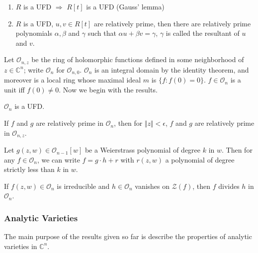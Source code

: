 \begin{enumerate}
	\item $R$ is a UFD $\Rightarrow$ $R[t]$ is a UFD (Gauss' lemma)
	\item $R$ is a UFD, $u,v \in R[t]$ are relatively prime, then there are relatively prime polynomials $\alpha, \beta$ and $\gamma$ such that $\alpha u + \beta v = \gamma$, $\gamma$ is called the resultant of $u$ and $v$.
\end{enumerate}

Let $ \mathcal{O}_{n,z}$ be the ring of holomorphic functions defined in some neighborhood of $z \in \mathbb{C}^n$; write $\mathcal{O}_n$ for $\mathcal{O}_{n,0}$. $ \mathcal{ O }_n$ is an integral domain by the identity theorem, and moreover is a local ring whose maximal ideal $m$ is $ \{ f: f(0)=0 \} $. $f \in \mathcal{ O }_n$ is a unit iff $f(0) \neq 0$. Now we begin with the results.


\begin{prop}

$ \mathcal{ O }_n$ is a UFD.

\end{prop}


\begin{prop}

	If $f$ and $g$ are relatively prime in $ \mathcal{ O }_n$, then for $ \Vert z \Vert < \epsilon$, $f$ and $g$ are relatively prime in $ \mathcal{ O }_{n,z}$.

\end{prop}


\begin{thm}

	Let $g(z,w) \in \mathcal{ O }_{n-1}[w]$ be a Weierstrass polynomial of degree $k$ in $w$. Then for any $f \in \mathcal{ O }_n$, we can write $f = g \cdot h + r$ with $r(z,w)$ a polynomial of degree strictly less than $k$ in $w$.

\end{thm}


\begin{cor}

	If $f(z,w) \in \mathcal{ O }_n$ is irreducible and $h \in \mathcal{ O }_n$ vanishes on $ \mathcal{Z}(f)$, then $f$ divides $h$ in $ \mathcal{ O }_n$.

\end{cor}

\subsubsection{Analytic Varieties}
\indent The main purpose of the results given so far is describe the properties of analytic varieties in $ \mathbb{C}^n$.


